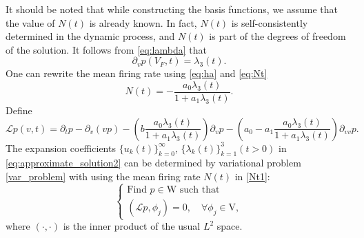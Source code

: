 It should be noted that while constructing the basis functions, we assume that the value of $N(t)$ is already known. In fact, $N(t)$ is self-consistently determined in the dynamic process, and $N(t)$ is part of the degrees of freedom of the solution. It follows from \eqref{eq:lambda} that
\begin{equation}
    \partial_vp(V_F,t)=\lambda_3(t).
\end{equation}
One can rewrite the mean firing rate using \eqref{eq:ha} and \eqref{eq:Nt}
\begin{equation}
    \label{Nt1}
    N(t)=-\frac{a_0\lambda_3(t)}{1+a_1\lambda_3(t)}.
\end{equation}
Define
\begin{equation}
    \label{eq:operator}
    \mathcal{L}p(v,t)=\partial_{t}p-\partial_v(vp)-\left(b\frac{a_0\lambda_3(t)}{1+a_1\lambda_3(t)}\right)\partial_{v}p-\left(a_0-a_1\frac{a_0\lambda_3(t)}{1+a_1\lambda_3(t)}\right)\partial_{v v}p.
\end{equation}
The expansion coefficients $\{u_k(t)\}_{k=0}^{\infty},\,\{\lambda_k(t)\}_{k=1}^{3}(t>0)$ in \eqref{eq:approximate_solution2} can be determined by variational problem \eqref{var_problem} with using the mean firing rate $N(t)$ in \eqref{Nt1}:
\begin{equation}
    \label{eq:nonlinear_system1}
    \begin{cases}
        \text{Find } p\in  \mathrm{W} \text{ such that}\\
        (\mathcal{L}p,\phi_j)=0,\quad \forall \phi_j \in \mathrm{V},
    \end{cases}
\end{equation}
where $(\cdot,\cdot)$ is the inner product of the usual $L^2$ space.

